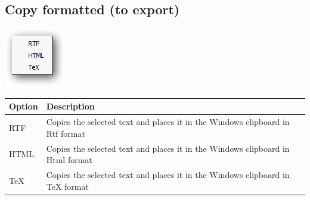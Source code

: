 \hypertarget{menu_edit_copyformatted}{}
\subsection{Copy formatted (to export)}

\includegraphics[scale=0.50]{./res/menu_edit_copyformated.png}\\

\begin{scriptsize}\begin{tabularx}{\textwidth}{>{\hsize=0.1\hsize}X>{\hsize=0.7\hsize}X}\\
    \hline
    \textbf{Option} & \textbf{Description} \\
    \hline
    RTF & Copies the selected text and places it in the Windows clipboard in Rtf format \\
    HTML & Copies the selected text and places it in the Windows clipboard in Html format \\
    TeX & Copies the selected text and places it in the Windows clipboard in TeX format \\
    \hline
  \end{tabularx}\end{scriptsize}
